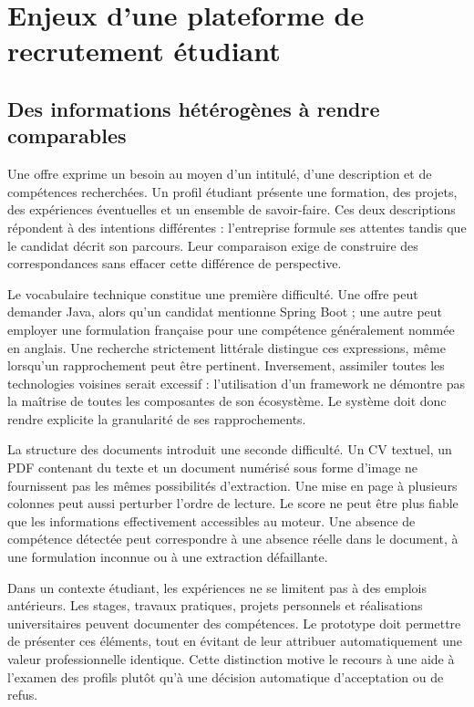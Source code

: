 \section{Enjeux d'une plateforme de recrutement étudiant}

\subsection{Des informations hétérogènes à rendre comparables}

Une offre exprime un besoin au moyen d'un intitulé, d'une description et de compétences recherchées. Un profil étudiant présente une formation, des projets, des expériences éventuelles et un ensemble de savoir-faire. Ces deux descriptions répondent à des intentions différentes : l'entreprise formule ses attentes tandis que le candidat décrit son parcours. Leur comparaison exige de construire des correspondances sans effacer cette différence de perspective.

Le vocabulaire technique constitue une première difficulté. Une offre peut demander Java, alors qu'un candidat mentionne Spring Boot ; une autre peut employer une formulation française pour une compétence généralement nommée en anglais. Une recherche strictement littérale distingue ces expressions, même lorsqu'un rapprochement peut être pertinent. Inversement, assimiler toutes les technologies voisines serait excessif : l'utilisation d'un framework ne démontre pas la maîtrise de toutes les composantes de son écosystème. Le système doit donc rendre explicite la granularité de ses rapprochements.

La structure des documents introduit une seconde difficulté. Un CV textuel, un PDF contenant du texte et un document numérisé sous forme d'image ne fournissent pas les mêmes possibilités d'extraction. Une mise en page à plusieurs colonnes peut aussi perturber l'ordre de lecture. Le score ne peut être plus fiable que les informations effectivement accessibles au moteur. Une absence de compétence détectée peut correspondre à une absence réelle dans le document, à une formulation inconnue ou à une extraction défaillante.

Dans un contexte étudiant, les expériences ne se limitent pas à des emplois antérieurs. Les stages, travaux pratiques, projets personnels et réalisations universitaires peuvent documenter des compétences. Le prototype doit permettre de présenter ces éléments, tout en évitant de leur attribuer automatiquement une valeur professionnelle identique. Cette distinction motive le recours à une aide à l'examen des profils plutôt qu'à une décision automatique d'acceptation ou de refus.

